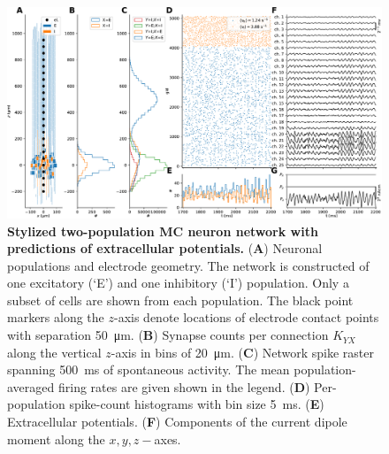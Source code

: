 \begin{figure}[!ht]
\begin{center}
\includegraphics[width=\textwidth]{Figures/Ch-LFPy/Ch-LFPy-network.pdf}
\end{center}
\caption{\textbf{Stylized two-population MC neuron network with predictions of extracellular potentials.}
({\bf A}) Neuronal populations and electrode geometry. The network is constructed of one excitatory (`E') and one inhibitory (`I') population.
Only a subset of cells are shown from each population.
The black point markers along the $z$-axis denote locations of electrode contact points with separation \SI{50}{\micro\metre}. 
({\bf B}) Synapse counts per connection $K_{YX}$ along the vertical $z$-axis in bins of \SI{20}{\micro\metre}.
({\bf C}) Network spike raster spanning \SI{500}{\milli\second} of spontaneous activity. 
The mean population-averaged firing rates are given shown in the legend.
({\bf D}) Per-population spike-count histograms with bin size \SI{5}{\milli\second}.
({\bf E}) Extracellular potentials.
({\bf F}) Components of the current dipole moment along the $x,y,z-$axes.
}
\label{fig:LFPy_network}
\end{figure}

